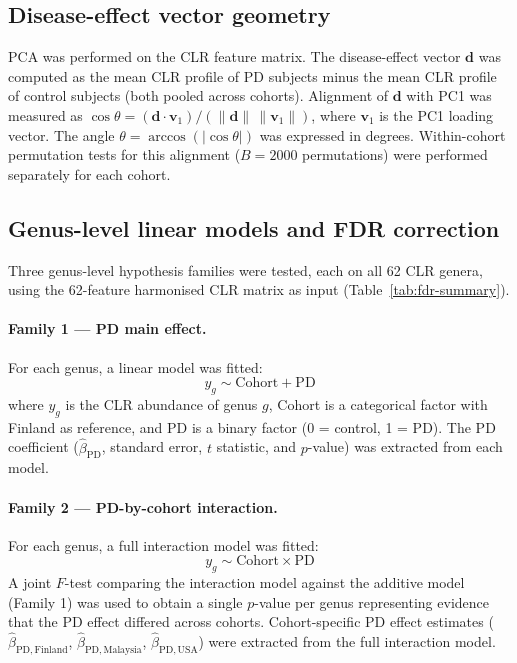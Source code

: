 \documentclass[12pt,a4paper]{article}
\begin{document}
\subsection{Disease-effect vector geometry}

PCA was performed on the CLR feature matrix. The disease-effect vector
$\mathbf{d}$ was computed as the mean CLR profile of PD subjects minus the
mean CLR profile of control subjects (both pooled across cohorts). Alignment
of $\mathbf{d}$ with PC1 was measured as $\cos\theta = (\mathbf{d} \cdot
\mathbf{v}_1) / (\|\mathbf{d}\|\,\|\mathbf{v}_1\|)$, where $\mathbf{v}_1$ is
the PC1 loading vector. The angle $\theta = \arccos(|\cos\theta|)$ was
expressed in degrees. Within-cohort permutation tests for this alignment
($B = 2000$ permutations) were performed separately for each cohort.

\subsection{Genus-level linear models and FDR correction}
\label{sec:fdr-methods}

Three genus-level hypothesis families were tested, each on all 62 CLR
genera, using the 62-feature harmonised CLR matrix as input
(Table~\ref{tab:fdr-summary}).

\paragraph{Family 1 --- PD main effect.}
For each genus, a linear model was fitted:
\[
y_g \sim \mathrm{Cohort} + \mathrm{PD}
\]
where $y_g$ is the CLR abundance of genus $g$, Cohort is a categorical
factor with Finland as reference, and PD is a binary factor (0 = control,
1 = PD). The PD coefficient ($\hat\beta_{\mathrm{PD}}$, standard error, $t$
statistic, and $p$-value) was extracted from each model.

\paragraph{Family 2 --- PD-by-cohort interaction.}
For each genus, a full interaction model was fitted:
\[
y_g \sim \mathrm{Cohort} \times \mathrm{PD}
\]
A joint $F$-test comparing the interaction model against the additive model
(Family 1) was used to obtain a single $p$-value per genus representing
evidence that the PD effect differed across cohorts.
Cohort-specific PD effect estimates ($\hat\beta_{\mathrm{PD,Finland}}$,
$\hat\beta_{\mathrm{PD,Malaysia}}$, $\hat\beta_{\mathrm{PD,USA}}$) were
extracted from the full interaction model.
\end{document}
